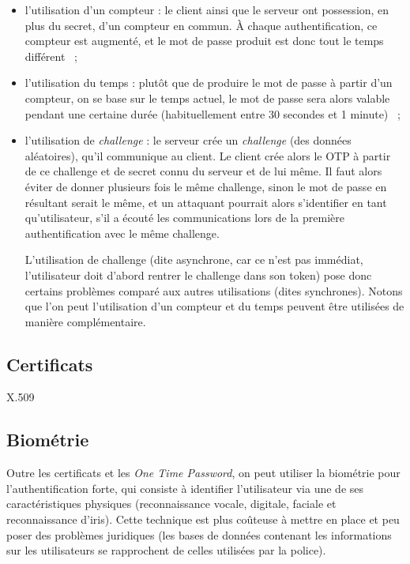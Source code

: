 \begin{itemize}
  \item l'utilisation d'un compteur : le client ainsi que le
serveur ont possession, en plus du secret, d'un compteur en
commun. À chaque authentification, ce compteur est augmenté, et le
mot de passe produit est donc tout le temps différent ~;
  \item l'utilisation du temps : plutôt que de produire le mot de
passe à partir d'un compteur, on se base sur le temps actuel, le
mot de passe sera alors valable pendant une certaine durée
(habituellement entre 30 secondes et 1 minute) ~;
  \item l'utilisation de \emph{challenge} : le serveur crée un
\emph{challenge} (des données aléatoires), qu'il communique au
client. Le client crée alors le OTP à partir de ce challenge et de
secret connu du serveur et de lui même. Il faut alors éviter de
donner plusieurs fois le même challenge, sinon le mot de passe en
résultant serait le même, et un attaquant pourrait alors
s'identifier en tant qu'utilisateur, s'il a écouté les
communications lors de la première authentification avec le même
challenge. 

L'utilisation de challenge (dite asynchrone, car ce n'est pas
immédiat, l'utilisateur doit d'abord rentrer le challenge dans 
son token) pose donc certains problèmes comparé aux autres 
utilisations (dites synchrones). Notons que l'on peut
l'utilisation d'un compteur et du temps peuvent être utilisées de
manière complémentaire.

\end{itemize}

\subsection{Certificats}
X.509

\subsection{Biométrie}
Outre les certificats et les \emph{One Time Password}, on peut
utiliser la biométrie pour l'authentification forte, qui consiste
à identifier l'utilisateur via une de ses caractéristiques
physiques (reconnaissance vocale, digitale, faciale et
reconnaissance d'iris).
Cette technique est plus coûteuse à mettre en place et peu poser
des problèmes juridiques (les bases de données contenant les
informations sur les utilisateurs se rapprochent de celles
utilisées par la police).

